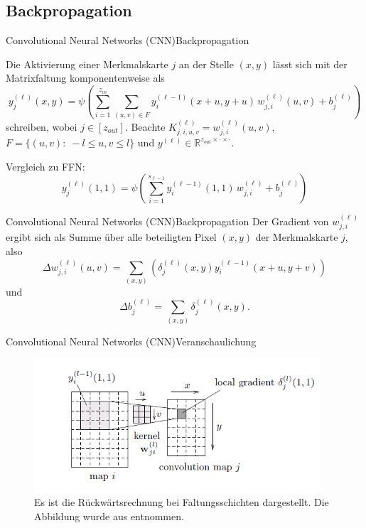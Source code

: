 \documentclass[10pt]{beamer} %
\newcommand{\RR}{\ensuremath{\mathbb{R}}}
\begin{document}
\subsection{Backpropagation}
\begin{frame}{Convolutional Neural Networks (CNN)}{Backpropagation}
 
   Die Aktivierung einer Merkmalskarte $j$ an der Stelle $(x,y)$ lässt sich mit der Matrixfaltung komponentenweise als
   \begin{equation*}
       y_j^{(\ell)}(x,y) =\psi \left(\sum_{i=1}^{z_{in}} \sum_{(u,v) \in F} y_i^{(\ell-1)}(x+u,y+u)\,  w_{j,i}^{(\ell)}(u,v) +b_j^{(\ell)}\right)
   \end{equation*}   
   schreiben, wobei $j \in [z_{out}]$. Beachte $K^{(\ell)}_{j,i,u,v}= w_{j,i}^{(\ell)}(u,v)$, $F=\{(u,v): \; -l \leq u,v \leq l\}$ und $y^{(\ell)} \in \RR^{z_{out} \times \cdot \times \cdot}$.
   \pause

   Vergleich zu FFN:
   \begin{equation*}
      y_j^{(\ell)}(1,1) =\psi \left(\sum_{i=1}^{s_{\ell-1}} y_i^{(\ell-1)}(1,1)\,  w_{j,i}^{(\ell)} +b_j^{(\ell)}\right)
  \end{equation*} 

\end{frame}

\begin{frame}{Convolutional Neural Networks (CNN)}{Backpropagation}
   Der Gradient von $w_{j,i}^{(\ell)}$ ergibt sich als Summe über alle beteiligten Pixel $(x,y)$ der Merkmalskarte $j$, also
\begin{equation*}
    \label{eq:CNN_K_grad}
    \Delta w_{j,i}^{(\ell)}(u,v)= \sum_{(x,y)} \left(\delta_j^{(\ell)}(x,y)  y_i^{(\ell-1)}(x+u,y+v)\right)
\end{equation*} und 
\begin{equation*}
   \Delta b_j^{(\ell)}= \sum_{(x,y)} \delta_j^{(\ell)}(x,y).
\end{equation*}
\end{frame}

\begin{frame}{Convolutional Neural Networks (CNN)}{Veranschaulichung}
   \begin{figure}
   \includegraphics[width=0.95\textwidth]{pics/backprop_dudiss.png}\caption[Rückwärtsrechnung bei CNN]{Es ist die Rückwärtsrechnung bei Faltungsschichten dargestellt. Die Abbildung wurde aus \cite{du_diss} entnommen.}
   \end{figure}
\end{frame}
\end{document}
